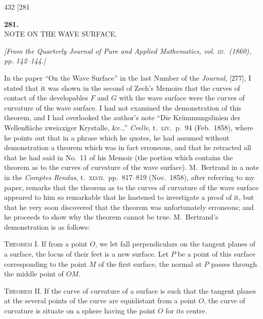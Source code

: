 \documentclass[11pt]{article}
\begin{document}
\bigskip
\begin{center}
432 \hfill \hfill \textsc{[281}
\end{center}

\begin{center}
\textbf{\large 281.}\\[1ex]
\textsc{NOTE ON THE WAVE SURFACE.}
\end{center}

\begin{center}
\textit{[From the Quarterly Journal of Pure and Applied Mathematics, vol. \textsc{iii}.\ (1860),
pp. 142--144.]}
\end{center}

\medskip

In the paper ``On the Wave Surface'' in the last Number of the \textit{Journal},
[277], I stated that it was shown in the second of Zech's Memoirs that the curves of
contact of the developables $F$ and $G$ with the wave surface were the curves of
curvature of the wave surface. I had not examined the demonstration of this theorem,
and I had overlooked the author's note ``Die Kr\"ummungslinien der Wellenfl\"ache
zweiaxiger Krystalle, \&c.,'' \textit{Crelle}, t.\ \textsc{liv}.\ p.\ 94 (Feb.\ 1858),
where he points out that in a phrase which he quotes, he had assumed without
demonstration a theorem which was in fact erroneous, and that he retracted all that
he had said in No.\ 11 of his Memoir (the portion which contains the theorem as to
the curves of curvature of the wave surface). M.\ Bertrand in a note in the
\textit{Comptes Rendus}, t.\ \textsc{xlvii}.\ pp.\ 817--819 (Nov.\ 1858), after
referring to my paper, remarks that the theorem as to the curves of curvature of the
wave surface appeared to him so remarkable that he hastened to investigate a proof
of it, but that he very soon discovered that the theorem was unfortunately erroneous;
and he proceeds to show why the theorem cannot be true. M.\ Bertrand's demonstration
is as follows:

\textsc{Theorem} I. If from a point $O$, we let fall perpendiculars on the tangent
planes of a surface, the locus of their feet is a new surface. Let $P$ be a point of
this surface corresponding to the point $M$ of the first surface, the normal at $P$
passes through the middle point of $OM$.

\textsc{Theorem} II. If the curve of curvature of a surface is such that the tangent
planes at the several points of the curve are equidistant from a point $O$, the curve
of curvature is situate on a sphere having the point $O$ for its centre.
\end{document}

